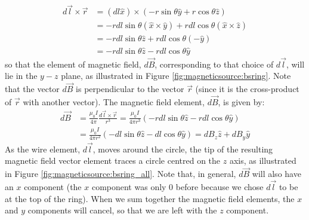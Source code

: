\begin{align*}
d\vec l \times \vec r &= (dl \hat x) \times ( - r\sin\theta \hat y+r\cos\theta \hat z)\\
&=-rdl\sin\theta (\hat x \times \hat y) + rdl\cos\theta (\hat x \times \hat z)\\
&=-rdl\sin\theta\hat z + rdl\cos\theta (-\hat y)\\
&=-rdl\sin\theta\hat z - rdl\cos\theta \hat y 
\end{align*}
so that the element of magnetic field, $d\vec B$, corresponding to that choice of $d\vec l$, will lie in the $y-z$ plane, as illustrated in Figure \ref{fig:magneticsource:bsring}. Note that the vector $d\vec B$ is perpendicular to the vector $\vec r$ (since it is the cross-product of $\vec r$ with another vector). The magnetic field element, $d\vec B$, is given by:
\begin{align*}
d\vec B &= \frac{\mu_0 I}{4\pi}\frac{d\vec l\times \vec r}{r^3}= \frac{\mu_0 I}{4\pi r^3}(-rdl\sin\theta\hat z - rdl\cos\theta \hat y )\\
&=\frac{\mu_0 I}{4\pi r^2}(-dl\sin\theta \hat z - dl\cos\theta \hat y)=dB_z\hat z + dB_y \hat y
\end{align*}
As the wire element, $d\vec l$, moves around the circle, the tip of the resulting magnetic field vector element traces a circle centred on the $z$ axis, as illustrated in Figure \ref{fig:magneticsource:bsring_all}. Note that, in general, $d\vec B$ will also have an $x$ component (the $x$ component was only 0 before because we chose $d\vec l$ to be at the top of the ring). When we sum together the magnetic field elements, the $x$ and $y$ components will cancel, so that we are left with the $z$ component.


